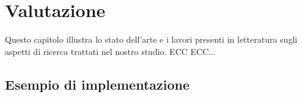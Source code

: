 \chapter{Valutazione}\label{valutazione} %
%

\begin{citazione}
Questo capitolo illustra lo stato dell'arte e i lavori presenti in letteratura sugli aspetti di ricerca trattati nel nostro studio. ECC ECC...
\end{citazione}

\newpage



\section{Esempio di implementazione}